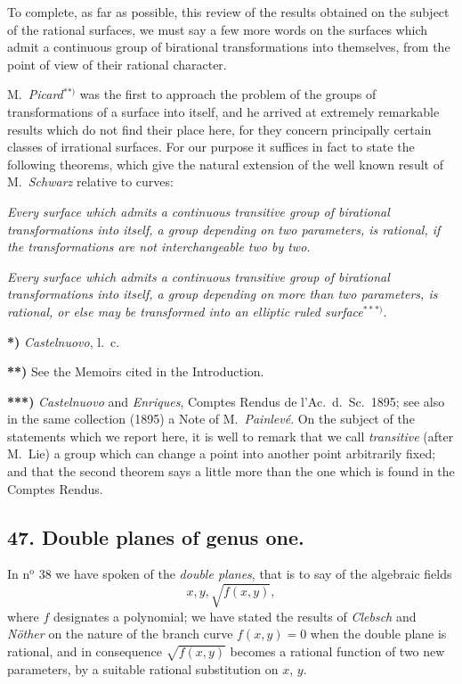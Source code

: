 \documentclass{article}
\begin{document}
To complete, as far as possible, this review of the results obtained on the subject of the rational surfaces, we must say a few more words on the surfaces which admit a continuous group of birational transformations into themselves, from the point of view of their rational character.

M.\ \emph{Picard}${}^{**)}$ was the first to approach the problem of the groups of transformations of a surface into itself, and he arrived at extremely remarkable results which do not find their place here, for they concern principally certain classes of irrational surfaces. For our purpose it suffices in fact to state the following theorems, which give the natural extension of the well known result of M.\ \emph{Schwarz} relative to curves:

\emph{Every surface which admits a continuous transitive group of birational transformations into itself, a group depending on two parameters, is rational, if the transformations are not interchangeable two by two.}

\emph{Every surface which admits a continuous transitive group of birational transformations into itself, a group depending on more than two parameters, is rational, or else may be transformed into an elliptic ruled surface}${}^{***)}$.

\textbf{*)} \emph{Castelnuovo}, l.\ c.

\textbf{**)} See the Memoirs cited in the Introduction.

\textbf{***)} \emph{Castelnuovo} and \emph{Enriques}, Comptes Rendus de l'Ac.\ d.\ Sc.\ 1895; see also in the same collection (1895) a Note of M.\ \emph{Painlevé}. On the subject of the statements which we report here, it is well to remark that we call \emph{transitive} (after M.\ Lie) a group which can change a point into another point arbitrarily fixed; and that the second theorem says a little more than the one which is found in the Comptes Rendus.


\subsection*{47. Double planes of genus one.}

In n${}^{\text{o}}$ 38 we have spoken of the \emph{double planes}, that is to say of the algebraic fields
\[ x, y, \sqrt{f(x, y)}, \]
where $f$ designates a polynomial; we have stated the results of \emph{Clebsch} and \emph{Nöther} on the nature of the branch curve $f(x, y) = 0$ when the double plane is rational, and in consequence $\sqrt{f(x, y)}$ becomes a rational function of two new parameters, by a suitable rational substitution on $x$, $y$.
\end{document}
